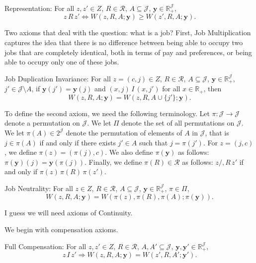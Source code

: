 \documentclass[12pt,thmsb]{article}
\begin{document}
Representation: For all $z,z'\in Z$, $R\in \mathcal{R}$, $A\subseteq \mathcal{J}$, $\mathbf{y}\in \mathbb{R}_{+}^{\mathcal{J}}$, 
\begin{equation*}
\label{label1}
z\,R\,z'\Leftrightarrow W(z,R,A;\mathbf{y})\geq W(z',R,A;\mathbf{y}).
\end{equation*}

Two axioms that deal with the question: what is a job? First, Job Multiplication captures the idea that there is no difference between being able to occupy two jobs that are completely identical, both in terms of pay and preferences, or being able to occupy only one of these jobs.

Job Duplication Invariance: For all $z=(c,j)\in Z$, $R\in \mathcal{R}$, $A\subseteq \mathcal{J}$, $\mathbf{y}\in \mathbb{R}_{+}^{\mathcal{J}}$, $j'\in \mathcal{J}\setminus A$, if $\mathbf{y}(j')=\mathbf{y}(j)$ and $(x,j)\,I\,(x,j')$ for all $x\in\mathbb{R}_{+}$, then
\begin{equation*}
\label{label2}
W(z,R,A;\mathbf{y})=W(z,R,A\cup\{j'\};\mathbf{y}).
\end{equation*}

To define the second axiom, we need the following terminology. Let $\pi:\mathcal{J}\rightarrow \mathcal{J}$ denote a permutation on $\mathcal{J}$. We let $\Pi$ denote the set of all permutations on $\mathcal{J}$. We let $\pi(A)\in 2^{\mathcal{J}}$ denote the permutation of elements of $A$ in $\mathcal{J}$, that is $j\in\pi(A)$ if and only if there exists $j'\in A$ such that $j=\pi(j')$. For $z=(j,c)$, we define $\pi(z)=(\pi(j),c)$. We also define $\pi(\mathbf{y})$ as follows: $\pi(\mathbf{y})(j)=\mathbf{y}(\pi(j))$. Finally, we define $\pi(R)\in\mathcal{R}$ as follows: $z/,R\,z'$ if and only if $\pi(z)\,\pi(R)\,\pi(z')$.

Job Neutrality: For all $z\in Z$, $R\in \mathcal{R}$, $A\subseteq \mathcal{J}$, $\mathbf{y}\in \mathbb{R}_{+}^{\mathcal{J}}$, $\pi\in\Pi$,
\begin{equation*}
\label{ }
W(z,R,A;\mathbf{y})=W(\pi(z),\pi(R),\pi(A);\pi(\mathbf{y})).
\end{equation*}

I guess we will need axioms of Continuity.

We begin with compensation axioms.

Full Compensation: For all $z,z'\in Z$, $R\in \mathcal{R}$, $A,A'\subseteq \mathcal{J}$, $\mathbf{y}, \mathbf{y}' \in \mathbb{R}_{+}^{\mathcal{J}}$, 
\begin{equation*}
\label{ }
z\,I\,z'\Rightarrow W(z,R,A;\mathbf{y})=W(z',R,A';\mathbf{y}').
\end{equation*}
\end{document}

